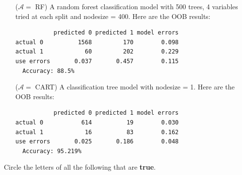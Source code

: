 \documentclass[12pt]{article}
\begin{document}
\begin{enumerate}
\item[($\mathcal{A} =$ RF)] A random forest classification model with 500 trees, 4 variables tried at each split and nodesize = 400. Here are the OOB results:

\begin{verbatim}
           predicted 0 predicted 1 model errors
actual 0          1568         170        0.098
actual 1            60         202        0.229
use errors       0.037       0.457        0.115
  Accuracy: 88.5%
\end{verbatim}

\item[($\mathcal{A} =$ CART)] A classification tree model with nodesize = 1. Here are the OOB results:

\begin{verbatim} 
           predicted 0 predicted 1 model errors
actual 0           614          19        0.030
actual 1            16          83        0.162
use errors       0.025       0.186        0.048
  Accuracy: 95.219%
\end{verbatim}
\end{enumerate}


 Circle the letters of all the following that are \textbf{true}.
\end{document}
